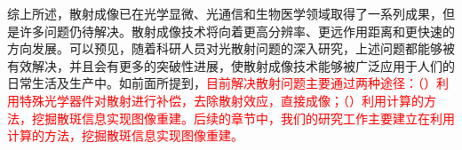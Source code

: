 综上所述，散射成像已在光学显微、光通信和生物医学领域取得了一系列成果，但是许多问题仍待解决。散射成像技术将向着更高分辨率、更远作用距离和更快速的方向发展。可以预见，随着科研人员对光散射问题的深入研究，上述问题都能够被有效解决，并且会有更多的突破性进展，使散射成像技术能够被广泛应用于人们的日常生活及生产中。如前面所提到，\textcolor{red}{目前解决散射问题主要通过两种途径：（）利用特殊光学器件对散射进行补偿，去除散射效应，直接成像；（）利用计算的方法，挖掘散斑信息实现图像重建。后续的章节中，我们的研究工作主要建立在利用计算的方法，挖掘散斑信息实现图像重建。}
